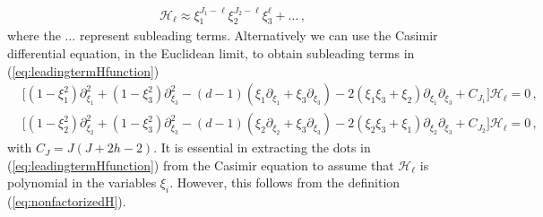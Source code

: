 \begin{align}
  \mathcal{H}_\ell \approx \xi_{1}^{J_1-\ell}\xi_{2}^{J_2-\ell} \xi_3^{\ell} +\dots\,, \label{eq:leadingtermHfunction}
\end{align}
where the $\dots$ represent subleading terms.  Alternatively we can use the Casimir differential equation, in the Euclidean limit, to obtain subleading terms in (\ref{eq:leadingtermHfunction})
\begin{align}
   & \displaystyle {\!\!\!\!\big[(1-\xi_1^2)\partial_{\xi_1}^2+(1-\xi_3^2)\partial_{\xi_3}^2-(d-1)(\xi_1\partial_{\xi_1}+\xi_3\partial_{\xi_3})-2(\xi_1\xi_3+\xi_2)\partial_{\xi_1}\partial_{\xi_3}+C_{J_1}\big]\mathcal{H}_{\ell}=0}\,,
  \label{eq:AngulardifferentialEquation}                                                                                                                                                                                                 \\
   & \displaystyle {\!\!\!\!\big[(1-\xi_2^2)\partial_{\xi_2}^2+(1-\xi_3^2)\partial_{\xi_3}^2-(d-1)(\xi_2\partial_{\xi_2}+\xi_3\partial_{\xi_3})-2(\xi_2\xi_3+\xi_1)\partial_{\xi_2}\partial_{\xi_3}+C_{J_2}\big]\mathcal{H}_{\ell}=0}\,,
  \nonumber
\end{align}
with $C_J=J(J+2h-2)$.
It is essential in extracting the dots in (\ref{eq:leadingtermHfunction}) from the Casimir equation to assume that $\mathcal{H}_{\ell}$ is polynomial in the variables $\xi_i$.
However, this follows from the definition (\ref{eq:nonfactorizedH}).

